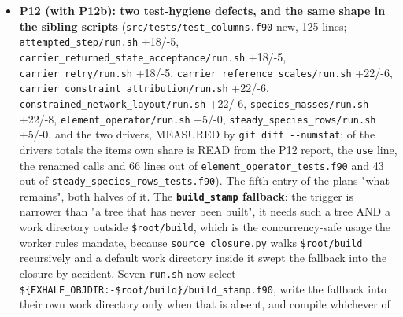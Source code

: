 \documentclass[english,a4paper]{my_memo}
\begin{document}
\begin{itemize}
  7.95, the \texttt{run.log} differing in exactly eight lines, every one of them a
  report of the momentum measure (the worst-row entry 1.8164E+00 at cell 438
  to 1.9788E+00 at cell 449) and none of them a state. On the carrier reload
  every pass line is identical but the momentum entry, which falls \textbf{1.32E-12
  to 3.22E-13} after pass 1 (4.47E-13 and 3.54E-13 at passes 2 and 3), the
  state as loaded reading 3.622E-01 to \textbf{3.311E-01} in its scaled momentum
  row, and all four output files byte-identical. What stays open: the
  kind-generic \texttt{EXHALE\_RESID\_QUAD} arm still hands back neither the momentum
  terms nor the face departures, so on that arm (default off, a rounding
  control experiment nothing is adopted from) both are read from the last
  \texttt{RK\_rhs} evaluation rather than from the state just assembled; the fix
  belongs in \texttt{hydrodynamic\_rows.f90}, which this item does not own.
\item
  \textbf{P12 (with P12b): two test-hygiene defects, and the same shape in the
  sibling scripts} (\texttt{src/tests/test\_columns.f90} new, 125 lines;
  \texttt{attempted\_step/run.sh} +18/-5, \texttt{carrier\_returned\_state\_acceptance/run.sh}
  +18/-5, \texttt{carrier\_retry/run.sh} +18/-5, \texttt{carrier\_reference\_scales/run.sh}
  +22/-6, \texttt{carrier\_constraint\_attribution/run.sh} +22/-6,
  \texttt{constrained\_network\_layout/run.sh} +22/-6, \texttt{species\_masses/run.sh} +22/-8,
  \texttt{element\_operator/run.sh} +5/-0, \texttt{steady\_species\_rows/run.sh} +5/-0, and the
  two drivers, MEASURED by \texttt{git\ diff\ -\/-numstat}; of the drivers\textquotesingle{} totals the
  item\textquotesingle s own share is READ from the P12 report, the \texttt{use} line, the renamed
  calls and 66 lines out of \texttt{element\_operator\_tests.f90} and 43 out of
  \texttt{steady\_species\_rows\_tests.f90}). The fifth entry of the plan\textquotesingle s "what
  remains", both halves of it. The \textbf{\texttt{build\_stamp} fallback}: the trigger is
  narrower than "a tree that has never been built", it needs such a tree AND a
  work directory outside \texttt{\$root/build}, which is the concurrency-safe usage
  the worker rules mandate, because \texttt{source\_closure.py} walks \texttt{\$root/build}
  recursively and a default work directory inside it swept the fallback into
  the closure by accident. Seven \texttt{run.sh} now select
  \texttt{\$\{EXHALE\_OBJDIR:-\$root/build\}/build\_stamp.f90}, write the fallback into
  their own work directory only when that is absent, and compile whichever of

\end{itemize}
\end{document}
